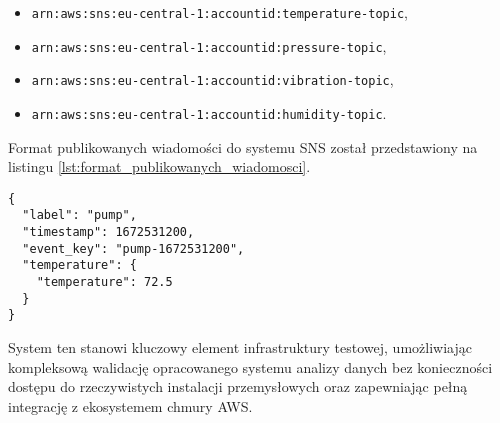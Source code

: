 \begin{itemize}
    \item \texttt{arn:aws:sns:eu-central-1:accountid:temperature-topic},
    \item \texttt{arn:aws:sns:eu-central-1:accountid:pressure-topic},
    \item \texttt{arn:aws:sns:eu-central-1:accountid:vibration-topic},
    \item \texttt{arn:aws:sns:eu-central-1:accountid:humidity-topic}.
\end{itemize}

\newpage

Format publikowanych wiadomości do systemu SNS został przedstawiony na listingu \ref{lst:format_publikowanych_wiadomosci}.

\begin{lstlisting}[caption=Format publikowanych wiadomości, label={lst:format_publikowanych_wiadomosci}]
{
  "label": "pump",
  "timestamp": 1672531200,
  "event_key": "pump-1672531200",
  "temperature": {
    "temperature": 72.5
  }
}
\end{lstlisting}


System ten stanowi kluczowy element infrastruktury testowej, umożliwiając kompleksową walidację opracowanego systemu analizy danych bez konieczności dostępu do rzeczywistych instalacji przemysłowych oraz zapewniając pełną integrację z ekosystemem chmury AWS.